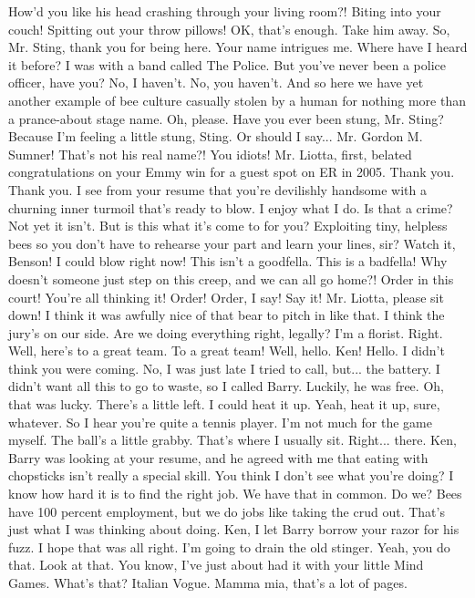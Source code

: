 \documentclass[a4paper,12pt]{article}
\begin{document}
How'd you like his head crashing through your living room?! Biting into your couch! Spitting out your throw pillows! OK, that's enough. Take him away.
So, Mr. Sting, thank you for being here. Your name intrigues me. Where have I heard it before?
I was with a band called The Police.
But you've never been a police officer, have you?
No, I haven't.
No, you haven't. And so here we have yet another example of bee culture casually stolen by a human for nothing more than a prance-about stage name.
Oh, please.
Have you ever been stung, Mr. Sting? Because I'm feeling a little stung, Sting. Or should I say... Mr. Gordon M. Sumner!
That's not his real name?! You idiots!
Mr. Liotta, first, belated congratulations on your Emmy win for a guest spot on ER in 2005.
Thank you. Thank you.
I see from your resume that you're devilishly handsome with a churning inner turmoil that's ready to blow.
I enjoy what I do. Is that a crime?
Not yet it isn't. But is this what it's come to for you? Exploiting tiny, helpless bees so you don't have to rehearse your part and learn your lines, sir?
Watch it, Benson! I could blow right now!
This isn't a goodfella.
This is a badfella!
Why doesn't someone just step on this creep, and we can all go home?!
Order in this court!
You're all thinking it!
Order! Order, I say!
Say it!
Mr. Liotta, please sit down!
I think it was awfully nice of that bear to pitch in like that. I think the jury's on our side.
Are we doing everything right, legally?
I'm a florist.
Right. Well, here's to a great team.
To a great team!
Well, hello.
Ken!
Hello.
I didn't think you were coming.
No, I was just late I tried to call, but... the battery.
I didn't want all this to go to waste,
so I called Barry. Luckily, he was free.
Oh, that was lucky.
There's a little left. I could heat it up.
Yeah, heat it up, sure, whatever.
So I hear you're quite a tennis player. I'm not much for the game myself. The ball's a little grabby.
That's where I usually sit. Right... there.
Ken, Barry was looking at your resume, and he agreed with me that eating with chopsticks isn't really a special skill.
You think I don't see what you're doing?
I know how hard it is to find the right job. We have that in common.
Do we?
Bees have 100 percent employment, but we do jobs like taking the crud out.
That's just what I was thinking about doing.
Ken, I let Barry borrow your razor for his fuzz. I hope that was all right.
I'm going to drain the old stinger.
Yeah, you do that.
Look at that.
You know, I've just about had it with your little Mind Games.
What's that?
Italian Vogue.
Mamma mia, that's a lot of pages.
\end{document}
